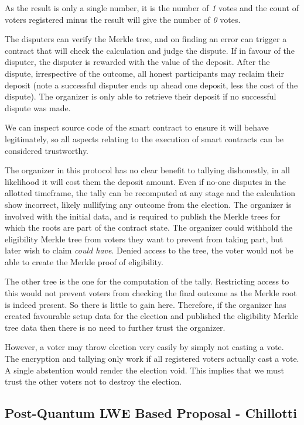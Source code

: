 As the result is only a single number, it is the number of \emph{1} votes and the count of voters registered minus the result will give the number of \emph{0} votes.

The disputers can verify the Merkle tree, and on finding an error can trigger a contract that will check the calculation and judge the dispute. If in favour of the disputer, the disputer is rewarded with the value of the deposit. After the dispute, irrespective of the outcome, all honest participants may reclaim their deposit (note a successful disputer ends up ahead one deposit, less the cost of the dispute). The organizer is only able to retrieve their deposit if no successful dispute was made.

We can inspect source code of the smart contract to ensure it will behave legitimately, so all aspects relating to the execution of smart contracts can be considered trustworthy.

The organizer in this protocol has no clear benefit to tallying dishonestly, in all likelihood it will cost them the deposit amount. Even if no-one disputes in the allotted timeframe, the tally can be recomputed at any stage and the calculation show incorrect, likely nullifying any outcome from the election. The organizer is involved with the initial data, and is required to publish the Merkle trees for which the roots are part of the contract state. The organizer could withhold the eligibility Merkle tree from voters they want to prevent from taking part, but later wish to claim \emph{could have}. Denied access to the tree, the voter would not be able to create the Merkle proof of eligibility.

The other tree is the one for the computation of the tally. Restricting access to this would not prevent voters from checking the final outcome as the Merkle root is indeed present. So there is little to gain here. Therefore, if the organizer has created favourable setup data for the election and published the eligibility Merkle tree data then there is no need to further trust the organizer.

However, a voter may throw election very easily by simply not casting a vote. The encryption and tallying only work if all registered voters actually cast a vote. A single abstention would render the election void. This implies that we must trust the other voters not to destroy the election.


\subsection{Post-Quantum LWE Based Proposal - Chillotti}


